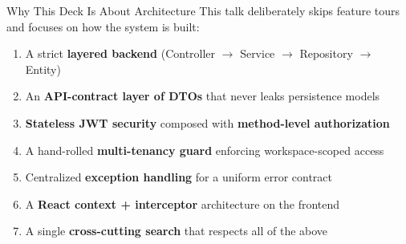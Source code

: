 \documentclass[aspectratio=169, 10pt]{beamer}
\begin{document}
\begin{frame}{Why This Deck Is About Architecture}
  This talk deliberately skips feature tours and focuses on \alert{how the system is built}:
  \begin{enumerate}\setlength\itemsep{8pt}
    \item A strict \textbf{layered backend} (Controller $\to$ Service $\to$ Repository $\to$ Entity)
    \item An \textbf{API-contract layer of DTOs} that never leaks persistence models
    \item \textbf{Stateless JWT security} composed with \textbf{method-level authorization}
    \item A hand-rolled \textbf{multi-tenancy guard} enforcing workspace-scoped access
    \item Centralized \textbf{exception handling} for a uniform error contract
    \item A \textbf{React context + interceptor} architecture on the frontend
    \item A single \textbf{cross-cutting search} that respects all of the above
  \end{enumerate}
\end{frame}
\end{document}
